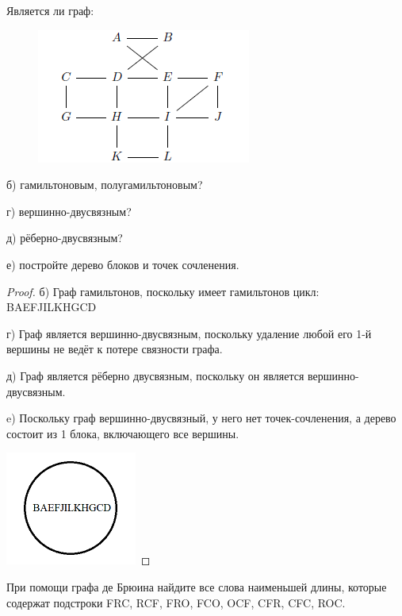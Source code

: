 \begin{problem}[5]
    Является ли граф: 
    \begin{figure}[h]
    \centering
     \includegraphics[width=0.4\linewidth]{pics/Graph5th.png}
     \label{fig:dm}
    \end{figure}
    
    б) гамильтоновым, полугамильтоновым?
    
    г) вершинно-двусвязным?

    д) рёберно-двусвязным?

    е) постройте дерево блоков и точек сочленения.
\end{problem}

\begin{proof}
	б) Граф гамильтонов, поскольку имеет гамильтонов цикл: BAEFJILKHGCD
    
    г) Граф является вершинно-двусвязным, поскольку удаление любой его 1-й вершины не ведёт к потере связности графа.

    д) Граф является рёберно двусвязным, поскольку он является вершинно-двусвязным.

    e) Поскольку граф вершинно-двусвязный, у него нет точек-сочленения, а дерево состоит из 1 блока, включающего все вершины.

    \centering\includegraphics[width=0.2\linewidth]{pics/5thEsolution.png}  
\end{proof}

\begin{problem}[6]
	При помощи графа де Брюина найдите все слова наименьшей длины, которые содержат подстроки FRC, RCF, FRO, FCO, OCF, CFR, CFC, ROC.
\end{problem}


